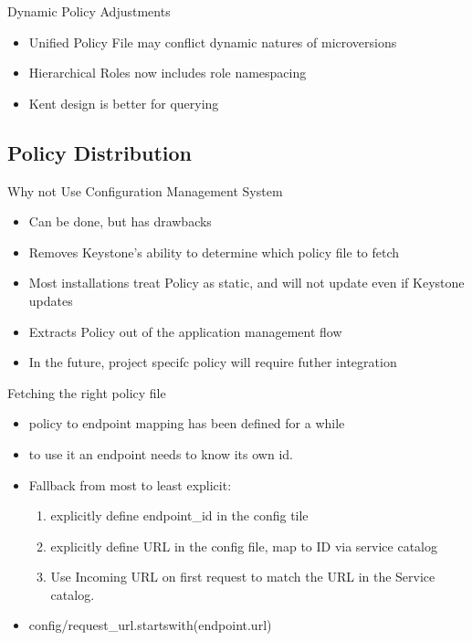 \documentclass{beamer}
\begin{document}
\begin{frame}{Dynamic Policy Adjustments}
  \begin{itemize}
  \item Unified Policy File may conflict dynamic natures of microversions
  \item Hierarchical Roles now includes role namespacing
  \item Kent design is better for querying
  \end{itemize}
\end{frame}


\subsection {Policy Distribution}


\begin{frame}{Why not Use Configuration Management System}
  \begin{itemize}
  \item Can be done, but has drawbacks
  \item Removes Keystone's ability to determine which policy file to fetch
  \item Most installations treat Policy as static, and will not update even if Keystone updates
  \item Extracts Policy out of the application management flow
  \item In the future, project specifc policy will require futher integration
  \end{itemize}
\end{frame}



\begin{frame}{Fetching the right policy file}
  \begin{itemize}
  \item policy to endpoint mapping has been defined for a while
  \item to use it an endpoint needs to know its own id.
  \item Fallback from most to least explicit:
    \begin{enumerate}
    \item explicitly define endpoint\_id in the config tile
    \item explicitly define URL in the config file, map to ID via service catalog
    \item Use Incoming URL on first request to match the URL in the Service catalog.
    \end{enumerate}
  \item config/request\_url.startswith(endpoint.url)
  \end{itemize}
\end{frame}
\end{document}
